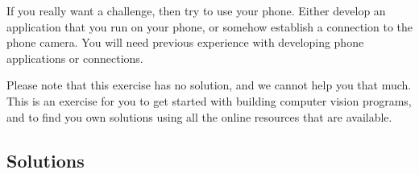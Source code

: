\documentclass{lecturenotes-handout}
\begin{document}
\begin{exercises}
\begin{exercise}
  If you really want a challenge, then try to use your phone. Either develop an application that you run on your phone, or somehow establish a connection to the phone camera.
  You will need previous experience with developing phone applications or connections.

  Please note that this exercise has no solution, and we cannot help you that much.
  This is an exercise for you to get started with building computer vision programs, and to find you own solutions using all the online resources that are available.
\end{exercise}

\subsection{Solutions}
\printallsolutions\

\end{exercises}

\end{document}
